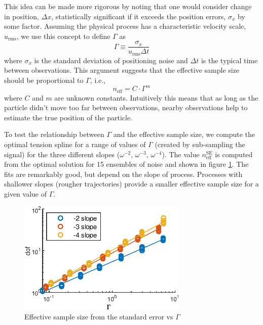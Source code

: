 \documentclass[10pt,journal]{IEEEtran}
\begin{document}
This idea can be made more rigorous by noting that one would consider change in position, $\Delta x$, statistically significant if it exceeds the position errors, $\sigma_x$ by some factor.  Assuming the physical process has a characteristic velocity scale, $u_{\textrm{rms}}$, we use this concept to define $\Gamma$ as
\begin{equation}
\label{gamma_equation}
\Gamma \equiv \frac{\sigma_x}{u_{\textrm{rms}}\Delta t}
\end{equation}
where $\sigma_x$ is the standard deviation of positioning noise and $\Delta t$ is the typical time between observations. This argument suggests that the effective sample size should be proportional to $\Gamma$, i.e.,
\begin{equation}
n_{\textrm{eff}} = C \cdot \Gamma^m
\end{equation}
where $C$ and $m$ are unknown constants. Intuitively this means that as long as the particle didn't move too far between observations, nearby observations help to estimate the true position of the particle.

To test the relationship between $\Gamma$ and the effective sample size, we compute the optimal tension spline for a range of values of $\Gamma$ (created by sub-sampling the signal) for the three different slopes ($\omega^{-2}$, $\omega^{-3}$, $\omega^{-4}$). The value $n_{\textrm{eff}}^\textrm{SE}$ is computed from the optimal solution for 15 ensembles of noise and shown in figure \ref{dofVsGamma}. The fits are remarkably good, but depend on the slope of process. Processes with shallower slopes (rougher trajectories) provide a smaller effective sample size for a given value of $\Gamma$.

\begin{figure}
  \centerline{\includegraphics[width=19pc,angle=0]{figures/dofVsGamma}}
  
  \caption{Effective sample size from the standard error vs $\Gamma$}
  \label{dofVsGamma}
\end{figure}
\end{document}
